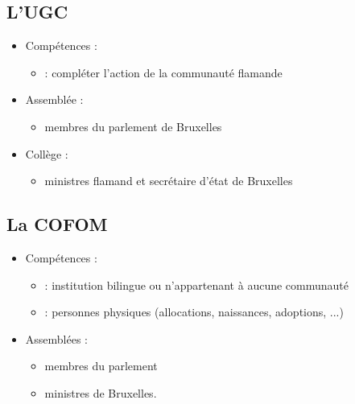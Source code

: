 \subsection{L'UGC}
\begin{itemize}
	\item Compétences :
	\begin{itemize}
		\item {} : compléter l'action de la communauté flamande
	\end{itemize}
	\item Assemblée :
	\begin{itemize}
		\item {} membres du parlement de Bruxelles
	\end{itemize}
	\item Collège :
	\begin{itemize}
		\item {} ministres flamand et secrétaire d'état de Bruxelles
	\end{itemize}
\end{itemize}

\subsection{La COFOM}
\begin{itemize}
	\item Compétences :
	\begin{itemize}
		\item {} : institution bilingue ou n'appartenant à aucune communauté
		\item {} : personnes physiques (allocations, naissances, adoptions, ...) 
	\end{itemize}
	\item Assemblées :
	\begin{itemize}
		\item {} membres du parlement
		\item {} ministres de Bruxelles.
	\end{itemize}
\end{itemize}
